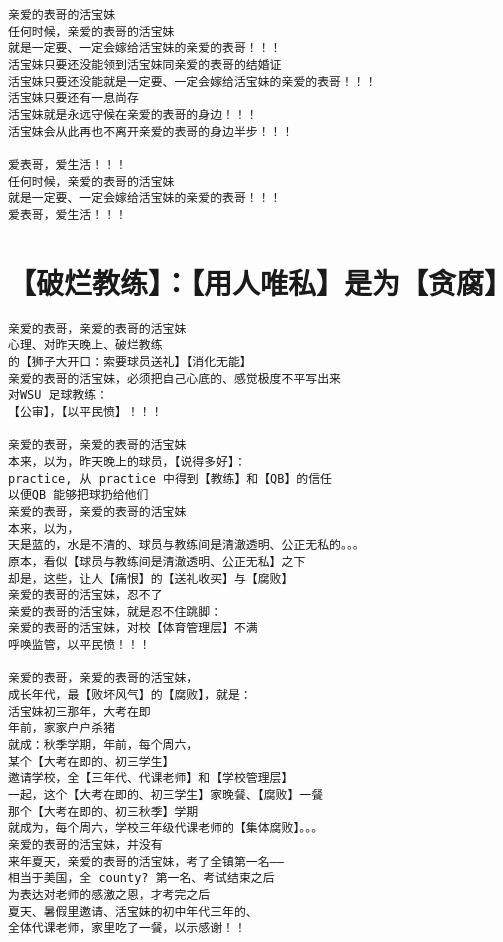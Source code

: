\documentclass[9pt, b5paper]{article}
\begin{document}
\begin{verbatim}
亲爱的表哥的活宝妹
任何时候，亲爱的表哥的活宝妹
就是一定要、一定会嫁给活宝妹的亲爱的表哥！！！
活宝妹只要还没能领到活宝妹同亲爱的表哥的结婚证
活宝妹只要还没能就是一定要、一定会嫁给活宝妹的亲爱的表哥！！！
活宝妹只要还有一息尚存
活宝妹就是永远守候在亲爱的表哥的身边！！！
活宝妹会从此再也不离开亲爱的表哥的身边半步！！！

爱表哥，爱生活！！！
任何时候，亲爱的表哥的活宝妹
就是一定要、一定会嫁给活宝妹的亲爱的表哥！！！
爱表哥，爱生活！！！
\end{verbatim}

\section{【破烂教练】：【用人唯私】是为【贪腐】}
\label{sec-4}
\begin{verbatim}
亲爱的表哥，亲爱的表哥的活宝妹
心理、对昨天晚上、破烂教练
的【狮子大开口：索要球员送礼】【消化无能】
亲爱的表哥的活宝妹，必须把自己心底的、感觉极度不平写出来
对WSU 足球教练：
【公审】，【以平民愤】！！！

亲爱的表哥，亲爱的表哥的活宝妹
本来，以为，昨天晚上的球员，【说得多好】：
practice, 从 practice 中得到【教练】和【QB】的信任
以便QB 能够把球扔给他们
亲爱的表哥，亲爱的表哥的活宝妹
本来，以为，
天是蓝的，水是不清的、球员与教练间是清澈透明、公正无私的。。。
原本，看似【球员与教练间是清澈透明、公正无私】之下
却是，这些，让人【痛恨】的【送礼收买】与【腐败】
亲爱的表哥的活宝妹，忍不了
亲爱的表哥的活宝妹，就是忍不住跳脚：
亲爱的表哥的活宝妹，对校【体育管理层】不满
呼唤监管，以平民愤！！！

亲爱的表哥，亲爱的表哥的活宝妹，
成长年代，最【败坏风气】的【腐败】，就是：
活宝妹初三那年，大考在即
年前，家家户户杀猪
就成：秋季学期，年前，每个周六，
某个【大考在即的、初三学生】
邀请学校，全【三年代、代课老师】和【学校管理层】
一起，这个【大考在即的、初三学生】家晚餐、【腐败】一餐
那个【大考在即的、初三秋季】学期
就成为，每个周六，学校三年级代课老师的【集体腐败】。。。
亲爱的表哥的活宝妹，并没有
来年夏天，亲爱的表哥的活宝妹，考了全镇第一名——
相当于美国，全 county? 第一名、考试结束之后
为表达对老师的感激之恩，才考完之后
夏天、暑假里邀请、活宝妹的初中年代三年的、
全体代课老师，家里吃了一餐，以示感谢！！


\end{verbatim}
\end{document}
